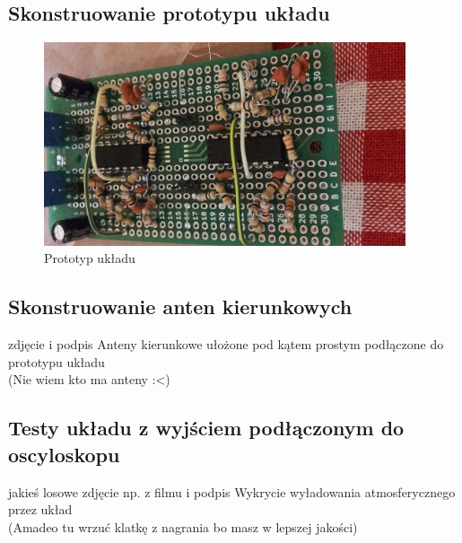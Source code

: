 \documentclass[12pt]{article}
\begin{document}
\subsection{Skonstruowanie prototypu układu}
\begin{figure}[H]
\begin{center}
\includegraphics[width=0.95\textwidth]{figures/plytka.png}
\caption{Prototyp układu}
\end{center}
\end{figure}

\subsection{Skonstruowanie anten kierunkowych}
zdjęcie i podpis Anteny kierunkowe ułożone pod kątem prostym podłączone do prototypu układu\\
(Nie wiem kto ma anteny :<)

\subsection{Testy układu z wyjściem podłączonym do oscyloskopu}
jakieś losowe zdjęcie np. z filmu i podpis Wykrycie wyładowania atmosferycznego przez układ\\
(Amadeo tu wrzuć klatkę z nagrania bo masz w lepszej jakości)
\end{document}
